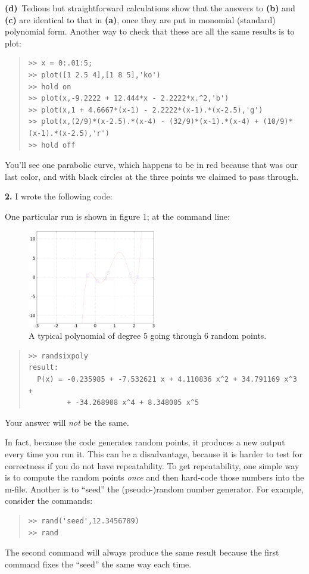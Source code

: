 \documentclass[11pt]{amsart}
\newcommand{\mfile}[1]{
\begin{quote}
\bigskip
\VerbatimInput[frame=single,label=\fbox{\normalsize \textsl{\,#1\,}},fontfamily=courier,fontsize=\scriptsize]{#1}
\end{quote}
}
\newcommand{\epart}[1]{\medskip\noindent\quad\textbf{(#1)}\, }
\newcommand{\prob}[1]{\medskip\noindent\textbf{#1.}\quad }
\begin{document}
\epart{d} Tedious but straightforward calculations show that the answers to \textbf{(b)} and \textbf{(c)} are identical to that in \textbf{(a)}, once they are put in monomial (standard) polynomial form.  Another way to check that these are all the same results is to plot:
\small \begin{quote}\begin{Verbatim}
>> x = 0:.01:5;
>> plot([1 2.5 4],[1 8 5],'ko')
>> hold on
>> plot(x,-9.2222 + 12.444*x - 2.2222*x.^2,'b')
>> plot(x,1 + 4.6667*(x-1) - 2.2222*(x-1).*(x-2.5),'g')
>> plot(x,(2/9)*(x-2.5).*(x-4) - (32/9)*(x-1).*(x-4) + (10/9)*(x-1).*(x-2.5),'r')
>> hold off
\end{Verbatim}
\end{quote} \normalsize
You'll see one parabolic curve, which happens to be in red because that was our last color, and with black circles at the three points we claimed to pass through.


\prob{2}  I wrote the following code:

\mfile{randsixpoly.m}

One particular run is shown in figure 1; at the command line:

\begin{figure}[ht]
\includegraphics[width=0.5\textwidth]{randsixpoly}
\caption{A typical polynomial of degree 5 going through 6 random points.}
\end{figure}

\small \begin{quote}\begin{Verbatim}
>> randsixpoly
result:
  P(x) = -0.235985 + -7.532621 x + 4.110836 x^2 + 34.791169 x^3 +
         + -34.268908 x^4 + 8.348005 x^5
\end{Verbatim}
\end{quote} \normalsize
Your answer will \emph{not} be the same.

In fact, because the code generates random points, it produces a new output every time you run it.  This can be a disadvantage, because it is harder to test for correctness if you do not have repeatability.  To get repeatability, one simple way is to compute the random points \emph{once} and then hard-code those numbers into the m-file.  Another is to ``seed'' the (pseudo-)random number generator.  For example, consider the commands:
\small \begin{quote}\begin{Verbatim}
>> rand('seed',12.3456789)
>> rand
\end{Verbatim}
\end{quote} \normalsize
The second command will always produce the same result because the first command fixes the ``seed'' the same way each time.
\end{document}
